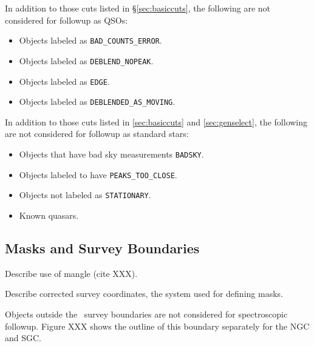 \documentclass[12pt,preprint]{aastex}
\begin{document}
In addition to those cuts listed in \S \ref{sec:basiccuts}, the following are
not considered for followup as QSOs:

\begin{itemize}

    \item Objects labeled as \texttt{BAD\_COUNTS\_ERROR}.
    \item Objects labeled as \texttt{DEBLEND\_NOPEAK}.
    \item Objects labeled as \texttt{EDGE}.
    \item Objects labeled as \texttt{DEBLENDED\_AS\_MOVING}.

\end{itemize}


 \label{sec:cutstd}

In addition to those cuts listed in \ref{sec:basiccuts} and
\ref{sec:genselect}, the following are not considered for followup as standard
stars:

\begin{itemize}

    \item Objects that have bad sky measurements \texttt{BADSKY}.
    \item Objects labeled to have \texttt{PEAKS\_TOO\_CLOSE}.
    \item Objects not labeled as \texttt{STATIONARY}.
    \item Known quasars.
   
\end{itemize}




\subsection{Masks and Survey Boundaries} \label{sec:masks}

Describe use of mangle (cite XXX).

Describe corrected survey coordinates, the system used for defining masks.

Objects outside the \boss\ survey boundaries are not considered for
spectroscopic followup. Figure XXX shows the outline of this boundary
separately for the NGC and SGC.
\end{document}
